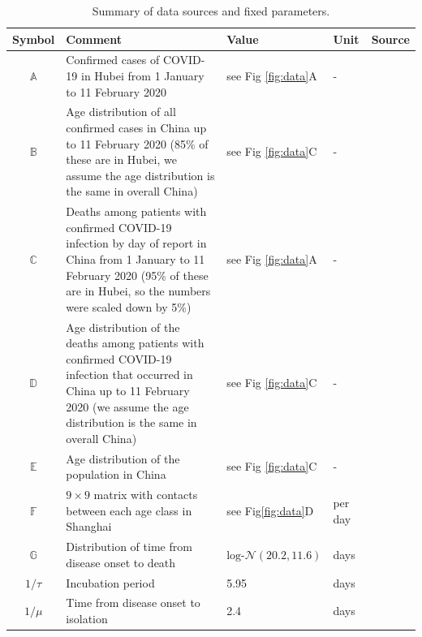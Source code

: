 \documentclass{article}
\begin{document}
	
	\begin{table}[h]
		\centering
		\caption{Summary of data sources and fixed parameters.}
		\begin{tabular}{cp{7cm}lll}
			\hline
			Symbol & Comment & Value & Unit & Source \\
			\hline 
			$\mathds{A}$ & Confirmed cases of COVID-19 in Hubei from 1 January to 11 February 2020  & see Fig \ref{fig:data}A & - & \cite{Team2020} \\
			$\mathds{B}$ & Age distribution of all confirmed cases in China up to 11 February 2020 (85\% of these are in Hubei, we assume the age distribution is the same in overall China) & see Fig \ref{fig:data}C & - & \cite{Team2020} \\
			$\mathds{C}$ & Deaths among patients with confirmed COVID-19 infection by day of report in China from 1 January to 11 February 2020 (95\% of these are in Hubei, so the numbers were scaled down by 5\%) & see Fig \ref{fig:data}A & - & \cite{Team2020} \\
			$\mathds{D}$ & Age distribution of the deaths among patients with confirmed COVID-19 infection that occurred in China up to 11 February 2020 (we assume the age distribution is the same in overall China) & see Fig \ref{fig:data}C & - & \cite{Team2020} \\
			$\mathds{E}$ & Age distribution of the population in China & see Fig \ref{fig:data}C & - & \cite{Worldometers.info} \\
			$\mathds{F}$ & $9\times 9$ matrix with contacts between each age class in Shanghai &  see Fig\ref{fig:data}D & per day & \cite{Zhang2019} \\  
			$\mathds{G}$ & Distribution of time from disease onset to death & $\text{log-}\mathcal{N}(20.2,11.6)$ & days & \cite{Linton2020a} \\
			$1/\tau$ & Incubation period & 5.95 & days &  \cite{Bi2020} \\
			$1/\mu$ & Time from disease onset to isolation & 2.4 & days & \cite{Bi2020} \\
			\hline 
		\end{tabular} 
	\end{table}
	
\end{document}
